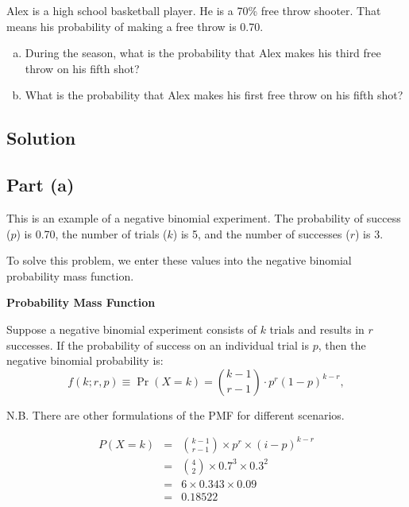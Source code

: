 \documentclass[a4paper,12pt]{article}
\begin{document}
\large


\noindent Alex is a high school basketball player. He is a 70\% free throw shooter. That means his probability of making a free throw is 0.70. 

\begin{enumerate}[(a)]
    \item During the season, what is the probability that Alex makes his third free throw on his fifth shot?
    \item  What is the probability that Alex makes his first free throw on his fifth shot?
\end{enumerate}


\subsection*{Solution}
\subsection*{Part (a)}
This is an example of a negative binomial experiment. The probability of success ($p$) is 0.70, the number of trials ($k$) is 5, and the number of successes ($r$) is 3.

\noindent To solve this problem, we enter these values into the negative binomial probability mass function.

\begin{framed}
\noindent \textbf{Probability Mass Function}

\noindent Suppose a negative binomial experiment consists of $k$ trials and results in $r$ successes. If the probability of success on an individual trial is $p$, then the negative binomial probability is:
\[
{\displaystyle f(k;r,p)\equiv \Pr(X=k)={k-1 \choose r-1}\cdot p^{r}(1-p)^{k-r},}\]

\noindent N.B. There are other formulations of the PMF for different scenarios.\\

\end{framed}


\begin{eqnarray*}
P(X=k)  &=& {k-1 \choose r-1} \times p^r \times (i-p)^{k - r}\\
 &=& {4 \choose 2} \times 0.7^3 \times  0.3^2 \\
  &=& 6 \times 0.343 \times  0.09 \\
&=& 0.18522 \\
\end{eqnarray*}
\end{document}
